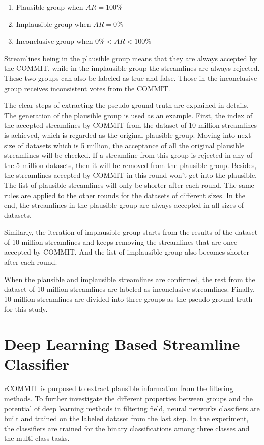 \begin{enumerate}
    \item Plausible group when $AR = 100\%$
    \item Implausible group when $AR = 0\%$
    \item Inconclusive group when $0\% <AR< 100\%$
  \end{enumerate}

Streamlines being in the plausible group means that they are always accepted by the COMMIT, while in the implausible group the streamlines are always rejected.
These two groups can also be labeled as true and false. Those in the inconclusive group receives inconsistent votes from the COMMIT. 

The clear steps of extracting the pseudo ground truth are explained in details. The generation of the plausible group is used as an example. 
First, the index of the accepted streamlines by COMMIT from the dataset of 10 million streamlines is achieved, which is regarded as the original plausible group.
Moving into next size of datasets which is 5 million, the acceptance of all the original plausible streamlines will be checked. 
If a streamline from this group is rejected in any of the 5 million datasets, then it will be removed from the plausible group.
Besides, the streamlines accepted by COMMIT in this round won't get into the plausible. The list of plausible streamlines will only be shorter after each round.
The same rules are applied to the other rounds for the datasets of different sizes. In the end, the streamlines in the plausible group 
are always accepted in all sizes of datasets. 

Similarly, the iteration of implausible group starts from the results of the dataset of 10 million streamlines and keeps removing the 
streamlines that are once accepted by COMMIT. And the list of implausible group also becomes shorter after each round.

When the plausible and implausible streamlines are confirmed, the rest from the dataset of 10 million streamlines are labeled 
as inconclusive streamlines. Finally, 10 million streamlines are divided into three groups as the pseudo ground truth for this study.

\section{Deep Learning Based Streamline Classifier}
rCOMMIT is purposed to extract plausible information from the filtering methods. To further investigate the different properties between groups and the potential
of deep learning methods in filtering field, neural networks classifiers are built and trained on the labeled dataset from the last step.
In the experiment, the classifiers are trained for the binary classifications among three classes and the multi-class tasks.

